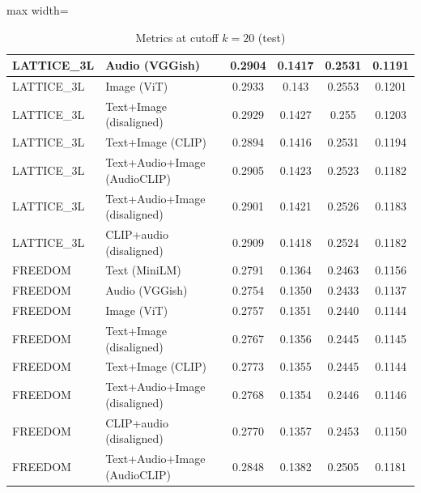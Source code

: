 \begin{table}[H]
\begin{adjustbox}{max width=\textwidth}
\begin{tabular}{|l|l|c|c|c|c|}
    \hline
    LATTICE\_3L & Audio (VGGish) & 0.2904 & 0.1417 & 0.2531 & 0.1191 \\
    \hline
    LATTICE\_3L & Image (ViT) & 0.2933 & 0.143 & 0.2553 & 0.1201 \\
    \hline
    LATTICE\_3L & Text+Image (disaligned) & 0.2929 & 0.1427 & 0.255 & 0.1203 \\
    \hline
    LATTICE\_3L & Text+Image (CLIP) & 0.2894 & 0.1416 & 0.2531 & 0.1194 \\
    \hline
    LATTICE\_3L & Text+Audio+Image (AudioCLIP) & 0.2905 & 0.1423 & 0.2523 & 0.1182 \\
    \hline
    LATTICE\_3L & Text+Audio+Image (disaligned) & 0.2901 & 0.1421 & 0.2526 & 0.1183 \\
    \hline
    LATTICE\_3L & CLIP+audio (disaligned) & 0.2909 & 0.1418 & 0.2524 & 0.1182 \\
    \hline
    FREEDOM & Text (MiniLM) & 0.2791 & 0.1364 & 0.2463 & 0.1156 \\
    \hline
    FREEDOM & Audio (VGGish) & 0.2754 & 0.1350 & 0.2433 & 0.1137 \\
    \hline
    FREEDOM & Image (ViT) & 0.2757 & 0.1351 & 0.2440 & 0.1144 \\
    \hline
    FREEDOM & Text+Image (disaligned) & 0.2767 & 0.1356 & 0.2445 & 0.1145 \\
    \hline
    FREEDOM & Text+Image (CLIP) & 0.2773 & 0.1355 & 0.2445 & 0.1144 \\
    \hline
    FREEDOM & Text+Audio+Image (disaligned) & 0.2768 & 0.1354 & 0.2446 & 0.1146 \\
    \hline
    FREEDOM & CLIP+audio (disaligned) & 0.2770 & 0.1357 & 0.2453 & 0.1150 \\
    \hline
    FREEDOM & Text+Audio+Image (AudioCLIP) & 0.2848 & 0.1382 & 0.2505 & 0.1181 \\
    \hline
    \end{tabular}
    \end{adjustbox}
    \caption{Metrics at cutoff $k=20$ (test)}
    \label{tab:metrics_k20}
\end{table}

